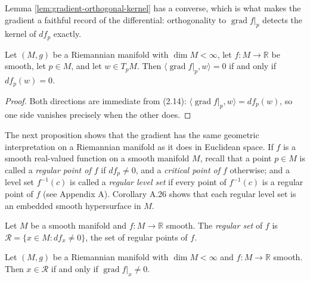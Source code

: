 Lemma \ref{lem:gradient-orthogonal-kernel} has a converse, which is what makes the gradient a faithful record of the differential: orthogonality to $\operatorname{grad} f|_p$ detects the kernel of $df_p$ exactly.

\begin{lemma}
\label{lem:gradient-orthogonal-iff}
\leanok
{}
Let $(M,g)$ be a Riemannian manifold with $\dim M < \infty$, let $f : M \to \mathbb{R}$ be smooth, let $p \in M$, and let $w \in T_p M$. Then $\langle \operatorname{grad} f|_p, w\rangle = 0$ if and only if $df_p(w) = 0$.
\end{lemma}

\begin{proof}
\leanok
{}
Both directions are immediate from (2.14): $\langle \operatorname{grad} f|_p, w\rangle = df_p(w)$, so one side vanishes precisely when the other does.
\end{proof}

The next proposition shows that the gradient has the same geometric interpretation
on a Riemannian manifold as it does in Euclidean space. If $f$ is a smooth
real-valued function on a smooth manifold $M$, recall that a point $p \in M$ is called a
\emph{regular point of $f$} if $df_p \neq 0$, and a \emph{critical point of $f$} otherwise; and a level set
$f^{-1}(c)$ is called a \emph{regular level set} if every point of $f^{-1}(c)$ is a regular point of $f$
(see Appendix A). Corollary A.26 shows that each regular level set is an embedded
smooth hypersurface in $M$.

\begin{definition}
\label{def:regular-set}
\leanok
Let $M$ be a smooth manifold and $f : M \to \mathbb{R}$ smooth. The \emph{regular set} of $f$ is $\mathcal{R} = \{x \in M : df_x \neq 0\}$, the set of regular points of $f$.
\end{definition}

\begin{lemma}
\label{lem:regular-set-eq-gradient-nonvanishing}
\leanok
{}
Let $(M,g)$ be a Riemannian manifold with $\dim M < \infty$ and $f : M \to \mathbb{R}$ smooth. Then $x \in \mathcal{R}$ if and only if $\operatorname{grad} f|_x \neq 0$.
\end{lemma}

